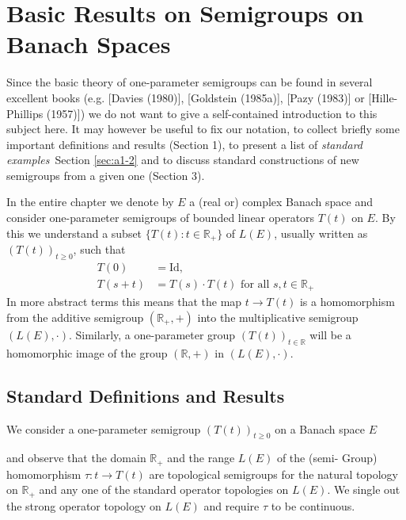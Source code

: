 

\chapter{Basic Results on Semigroups on Banach Spaces}\label{chap:a1}

Since the basic theory of one-parameter semigroups can be found in several excellent books (e.g. [Davies (1980)], [Goldstein (1985a)], [Pazy (1983)] or [Hille-Phillips (1957)]) we do not want to give a self-contained introduction to this subject here.
It may however be useful to fix our notation, to collect briefly some important definitions and results (Section 1), to present a list of \emph{standard examples}~Section \ref{sec:a1-2} %
and to discuss standard constructions of new semigroups from a given one (Section 3).

In the entire chapter we denote by $E$ a (real or) complex Banach space and consider one-parameter semigroups of bounded linear operators $T(t)$ on $E$.
By this we understand a subset $\{T(t) \colon  t \in \mathbb{R}_{+}\}$ of $L(E)$, usually written as $(T(t))_{t\geq0}$, such that
\begin{align*}
	T(0) &= \text{Id}, \\
	T(s+t) &= T(s) \cdot T(t) \text{ for all } s, t \in \mathbb{R}_{+}
\end{align*}
In more abstract terms this means that the map $t \to T(t)$ is a homomorphism from the additive semigroup $(\mathbb{R}_{+},+)$ into the multiplicative semigroup $(L(E),\cdot)$.
Similarly, a one-parameter group $(T(t))_{t\in\mathbb{R}}$ will be a homomorphic image of the group $(\mathbb{R},+)$ in $(L(E),\cdot)$.
\section{Standard Definitions and Results}\label{sec:a1-1}
We consider a one-parameter semigroup $(T(t))_{t \geq 0}$ on a Banach space $E$ 

\newpage
and observe that the domain $\mathbb{R}_{+}$ and the range $L(E)$ of the (semi-
Group) homomorphism $\tau \colon t \to T(t)$ are topological semigroups for the natural topology on $\mathbb{R}_{+}$ and any one of the standard operator topologies on $L(E)$.
We single out the strong operator topology on $L(E)$ and require $\tau$ to be continuous.

